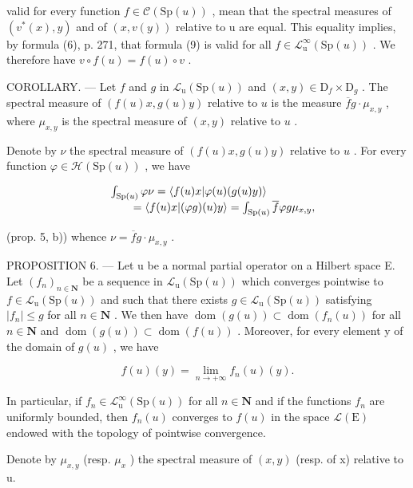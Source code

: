 valid for every function \(f \in \mathcal{C}(\mathrm{Sp}(u))\) , mean that the spectral measures of \((v^{*}(x), y)\) and of \((x, v(y))\) relative to u are equal. This equality implies, by formula (6), p. 271, that formula (9) is valid for all \(f \in \mathcal{L}_{\mathrm{u}}^{\infty}(\mathrm{Sp}(u))\) . We therefore have \(v \circ f(u) = f(u) \circ v\) .

COROLLARY. --- Let \(f\) and \(g\) in \(\mathcal{L}_{\mathrm{u}}(\mathrm{Sp}(u))\) and \((x,y)\in\mathrm{D}_{f}\times\mathrm{D}_{g}\) . The spectral measure of \((f(u)x,g(u)y)\) relative to \(u\) is the measure \(\overline{f}g\cdot\mu_{x,y}\) , where \(\mu_{x,y}\) is the spectral measure of \((x,y)\) relative to \(u\) .

Denote by \(\nu\) the spectral measure of \((f(u)x,g(u)y)\) relative to \(u\) . For every function \(\varphi \in \mathcal{H}(\mathrm{Sp}(u))\) , we have

\[
\begin{array}{r l} & {\int_ {\mathrm{Sp} (u)} \varphi \nu = \langle f (u) x | \varphi (u) (g (u) y) \rangle} \\ & {\qquad = \langle f (u) x | (\varphi g) (u) y \rangle = \int_ {\mathrm{Sp} (u)} \overline {{f}} \varphi g \mu_ {x, y},} \end{array}
\]

(prop. 5, b)) whence \(\nu = \overline{f} g \cdot \mu_{x,y}\) .

PROPOSITION 6. --- Let u be a normal partial operator on a Hilbert space E. Let \((f_n)_{n \in \mathbf{N}}\) be a sequence in \(\mathcal{L}_{\mathrm{u}}(\mathrm{Sp}(u))\) which converges pointwise to \(f \in \mathcal{L}_{\mathrm{u}}(\mathrm{Sp}(u))\) and such that there exists \(g \in \mathcal{L}_{\mathrm{u}}(\mathrm{Sp}(u))\) satisfying \(|f_n| \leqslant g\) for all \(n \in \mathbf{N}\) . We then have \(\operatorname{dom}(g(u)) \subset \operatorname{dom}(f_n(u))\) for all \(n \in \mathbf{N}\) and \(\operatorname{dom}(g(u)) \subset \operatorname{dom}(f(u))\) . Moreover, for every element y of the domain of \(g(u)\) , we have

\[
f (u) (y) = \lim _ {n \to + \infty} f _ {n} (u) (y).
\]

In particular, if \(f_{n} \in \mathcal{L}_{\mathrm{u}}^{\infty}(\mathrm{Sp}(u))\) for all \(n \in \mathbf{N}\) and if the functions \(f_{n}\) are uniformly bounded, then \(f_{n}(u)\) converges to \(f(u)\) in the space \(\mathcal{L}(\mathrm{E})\) endowed with the topology of pointwise convergence.

Denote by \(\mu_{x,y}\) (resp. \(\mu_{x}\) ) the spectral measure of \((x,y)\) (resp. of x) relative to u.

